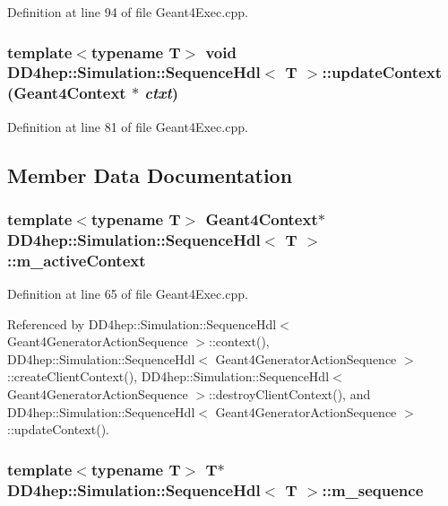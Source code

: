 Definition at line 94 of file Geant4Exec.cpp.\hypertarget{class_d_d4hep_1_1_simulation_1_1_sequence_hdl_a6f0b9120d430d93caafb6d3d9f360ecf}{
\subsubsection[{updateContext}]{\setlength{\rightskip}{0pt plus 5cm}template$<$typename T$>$ void {\bf DD4hep::Simulation::SequenceHdl}$<$ {\bf T} $>$::updateContext ({\bf Geant4Context} $\ast$ {\em ctxt})}}
\label{class_d_d4hep_1_1_simulation_1_1_sequence_hdl_a6f0b9120d430d93caafb6d3d9f360ecf}


Definition at line 81 of file Geant4Exec.cpp.

\subsection{Member Data Documentation}
\hypertarget{class_d_d4hep_1_1_simulation_1_1_sequence_hdl_addf2b3ddaa1263ae4213a5189f7859b5}{
\subsubsection[{m\_\-activeContext}]{\setlength{\rightskip}{0pt plus 5cm}template$<$typename T$>$ {\bf Geant4Context}$\ast$ {\bf DD4hep::Simulation::SequenceHdl}$<$ {\bf T} $>$::{\bf m\_\-activeContext}}}
\label{class_d_d4hep_1_1_simulation_1_1_sequence_hdl_addf2b3ddaa1263ae4213a5189f7859b5}


Definition at line 65 of file Geant4Exec.cpp.

Referenced by DD4hep::Simulation::SequenceHdl$<$ Geant4GeneratorActionSequence $>$::context(), DD4hep::Simulation::SequenceHdl$<$ Geant4GeneratorActionSequence $>$::createClientContext(), DD4hep::Simulation::SequenceHdl$<$ Geant4GeneratorActionSequence $>$::destroyClientContext(), and DD4hep::Simulation::SequenceHdl$<$ Geant4GeneratorActionSequence $>$::updateContext().\hypertarget{class_d_d4hep_1_1_simulation_1_1_sequence_hdl_ae825c3a994baf6bb24fd37e547a67dff}{
\subsubsection[{m\_\-sequence}]{\setlength{\rightskip}{0pt plus 5cm}template$<$typename T$>$ {\bf T}$\ast$ {\bf DD4hep::Simulation::SequenceHdl}$<$ {\bf T} $>$::{\bf m\_\-sequence}}}
\label{class_d_d4hep_1_1_simulation_1_1_sequence_hdl_ae825c3a994baf6bb24fd37e547a67dff}


